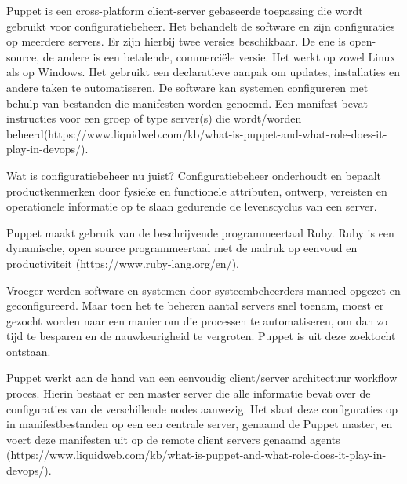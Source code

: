 Puppet is een cross-platform client-server gebaseerde toepassing die wordt gebruikt voor configuratiebeheer. Het behandelt de software en zijn configuraties op meerdere servers. Er zijn hierbij twee versies beschikbaar. De ene is open-source, de andere is een betalende, commerciële versie. Het werkt op zowel Linux als op Windows. Het gebruikt een declaratieve aanpak om updates, installaties en andere taken te automatiseren. De software kan systemen configureren met behulp van bestanden die manifesten worden genoemd. Een manifest bevat instructies voor een groep of type server(s) die wordt/worden beheerd(https://www.liquidweb.com/kb/what-is-puppet-and-what-role-does-it-play-in-devops/). 

Wat is configuratiebeheer nu juist? Configuratiebeheer onderhoudt en bepaalt productkenmerken door fysieke en functionele attributen, ontwerp, vereisten en operationele informatie op te slaan gedurende de levenscyclus van een server. 

Puppet maakt gebruik van de beschrijvende programmeertaal Ruby. Ruby is een dynamische, open source programmeertaal met de nadruk op eenvoud en productiviteit (https://www.ruby-lang.org/en/).

Vroeger werden software en systemen door systeembeheerders manueel opgezet en geconfigureerd. Maar toen het te beheren aantal servers snel toenam, moest er gezocht worden naar een manier om die processen te automatiseren, om dan zo tijd te besparen en de nauwkeurigheid te vergroten. Puppet is uit deze zoektocht ontstaan.

Puppet werkt aan de hand van een eenvoudig client/server architectuur workflow proces. Hierin bestaat er een master server die alle informatie bevat over de configuraties van de verschillende nodes aanwezig. Het slaat deze configuraties op in manifestbestanden op een een centrale server, genaamd de Puppet master, en voert deze manifesten uit op de remote client servers genaamd agents (https://www.liquidweb.com/kb/what-is-puppet-and-what-role-does-it-play-in-devops/).

